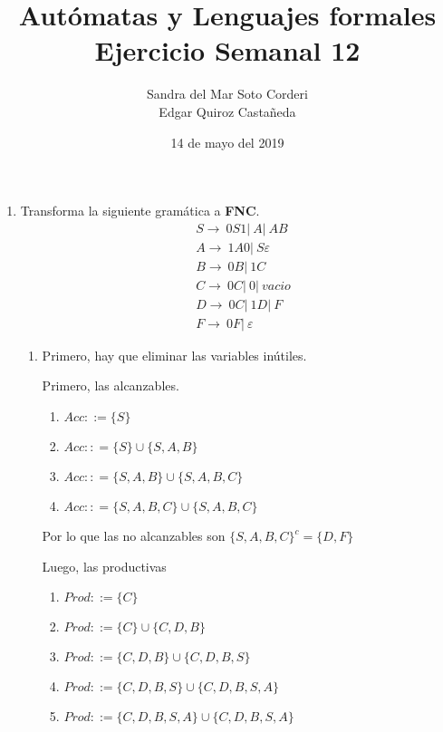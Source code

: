 \documentclass{article}
\begin{document}
\title{
    Autómatas y Lenguajes formales \\
    Ejercicio Semanal 12
}

\author{
    Sandra del Mar Soto Corderi \\
    Edgar Quiroz Castañeda
}

\date{
    14 de mayo del 2019
}

\maketitle

\begin{enumerate}
    \item Transforma la siguiente gramática a \textbf{FNC}.
    \begin{align*}
        &S \rightarrow \ 0S1 |\ A |\ AB \\
        &A \rightarrow \ 1A0 |\ S\varepsilon \\
        &B \rightarrow \ 0B |\ 1C \\
        &C \rightarrow \ 0C |\ 0 |\ vacio \\
        &D \rightarrow \ 0C |\ 1D |\ F \\
        &F \rightarrow \ 0F |\ \varepsilon
    \end{align*}
    \begin{enumerate}
        \item Primero, hay que eliminar las variables inútiles.
        
        Primero, las alcanzables.
        \begin{enumerate}
            \item $Acc ::= \{S\}$
            \item $Acc :: = \{S\} \cup \{S, A, B\}$
            \item $Acc :: = \{S, A, B\} \cup \{S, A, B, C\}$
            \item $Acc :: = \{S, A, B, C\} \cup \{S, A, B, C\}$
        \end{enumerate}

        Por lo que las no alcanzables son $\{S, A, B, C\}^{c} = \{D, F\}$

        Luego, las productivas
        \begin{enumerate}
            \item $Prod ::= \{C\}$
            \item $Prod ::= \{C\} \cup \{C, D, B\}$
            \item $Prod ::= \{C, D, B\} \cup \{C, D, B, S\}$
            \item $Prod ::= \{C, D, B, S\} \cup \{C, D, B, S, A\}$
            \item $Prod ::= \{C, D, B, S, A\} \cup \{C, D, B, S, A\}$
        \end{enumerate}


\end{enumerate}
\end{enumerate}
\end{document}
